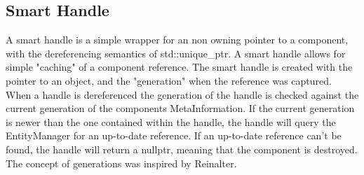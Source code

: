 \subsection{Smart Handle}


A smart handle is a simple wrapper for an non owning pointer to a component, with the dereferencing semantics of std::unique\_ptr. 
A smart handle allows for simple "caching" of a component reference.
The smart handle is created with the pointer to an object, 
and the "generation" when the reference was captured. 
When a handle is dereferenced the generation of the handle is checked against the current generation of the components MetaInformation. 
If the current generation is newer than the one contained within the handle, 
the handle will query the EntityManager for an up-to-date reference.
If an up-to-date reference can't be found, 
the handle will return a nullptr, meaning that the component is destroyed.
The concept of generations was inspired by Reinalter\cite{molecular_musings_internal_references}.
